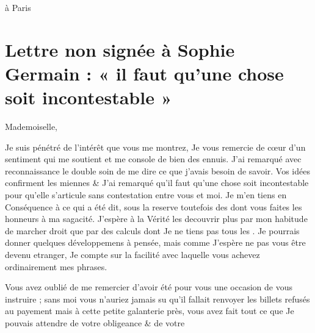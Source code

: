 \documentclass[11pt,a4paper]{article}
\begin{document}
à Paris

\section{Lettre non signée à Sophie Germain : « il faut qu'une chose soit incontestable »}

Mademoiselle,

Je suis pénétré de l'intérêt que vous me montrez, Je vous remercie de cœur
d'un sentiment qui me soutient et me console de bien des ennuis. J'ai
remarqué avec reconnaissance le double soin de me dire ce que j'avais besoin
de savoir. Vos idées confirment les miennes \& J'ai remarqué qu'il faut
qu'une chose soit incontestable pour qu'elle s'articule sans contestation
entre vous et moi. Je m'en tiens en Conséquence à ce qui a été dit, sous la
reserve toutefois des  dont vous faites les honneurs à ma
sagacité. J'espère à la Vérité les decouvrir plus par mon habitude de marcher
droit que par des calculs dont Je ne tiens pas tous les \ill{}. Je pourrais
donner quelques développemens à \ill{} pensée, mais comme J'espère ne pas
vous être devenu etranger, Je compte sur la facilité avec laquelle vous
achevez ordinairement mes phrases.

Vous avez oublié de me remercier d'avoir été pour vous une occasion de vous
instruire ; sans moi vous n'auriez jamais su qu'il fallait renvoyer les
billets refusés au payement mais à cette petite galanterie près, vous avez
fait tout ce que Je pouvais attendre de votre obligeance \& de votre

\end{document}
